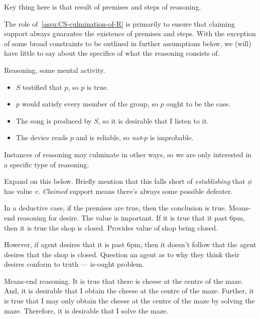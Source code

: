 \begin{note}
  Key thing here is that result of premises and steps of reasoning.

  The role of~\autoref{assu:CS-culmination-of-R} is primarily to ensure that claiming support always guarantee the existence of premises and steps.
  With the exception of some broad constraints to be outlined in further assumptions below, we (will) have little to say about the specifics of what the reasoning consists of.
\end{note}

\begin{note}
  Reasoning, some mental activity.
\end{note}

\begin{note}
  \begin{itemize}
  \item \(S\) testified that \(p\), so \(p\) is true.
  \item \(p\) would satisfy every member of the group, so \(p\) ought to be the case.
  \item The song is produced by \(S\), so it is desirable that I listen to it.
  \item The device reads \(p\) and is reliable, so \emph{not}-\(p\) is improbable.
  \end{itemize}
\end{note}

\begin{note}
  Instances of reasoning may culminate in other ways, so we are only interested in a specific type of reasoning.
\end{note}

\begin{note}
  Expand on this below.
  Briefly mention that this falls short of \emph{establishing} that \(\phi\) has value \(v\).
  \emph{Claimed} support means there's always some possible defeater.
\end{note}

\begin{note}
  In a deductive case, if the premises are true, then the conclusion is true.
  Means-end reasoning for desire.
  The value is important.
  If it is true that it past 6pm, then it is true the shop is closed.
  Provides value of shop being closed.

  However, if agent desires that it is past 6pm, then it doesn't follow that the agent desires that the shop is closed.
  Question an agent as to why they think their desires conform to truth --- is-ought problem.

  Means-end reasoning.
  It is true that there is cheese at the centre of the maze.
  And, it is desirable that I obtain the cheese at the centre of the maze.
  Further, it is true that I may only obtain the cheese at the centre of the maze by solving the maze.
  Therefore, it is desirable that I solve the maze.
\end{note}

